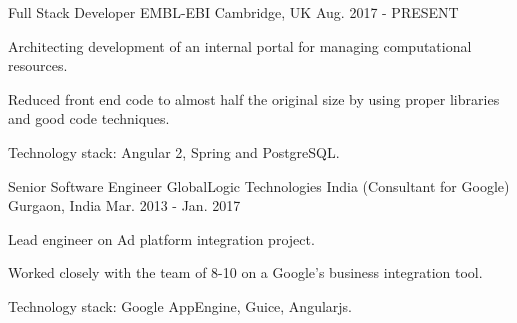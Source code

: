 

\begin{cventries}

  \cventry
    {Full Stack Developer} %
    {EMBL-EBI} %
    {Cambridge, UK} %
    {Aug. 2017 - PRESENT} %
    {
      \begin{cvitems} %
        \item {Architecting development of an internal portal for managing computational resources.}
        \item {Reduced front end code to almost half the original size by using proper libraries and good code techniques.}
        \item {Technology stack: Angular 2, Spring and PostgreSQL.}
      \end{cvitems}
    }

  \cventry
    {Senior Software Engineer} %
    {GlobalLogic Technologies India (Consultant for Google)} %
    {Gurgaon, India} %
    {Mar. 2013 - Jan. 2017} %
    {
      \begin{cvitems} %
        \item {Lead engineer on Ad platform integration project.}
        \item {Worked closely with the team of 8-10 on a Google’s business integration tool.}
        \item {Technology stack: Google AppEngine, Guice, Angularjs.}
      \end{cvitems}
    }


\end{cventries}
